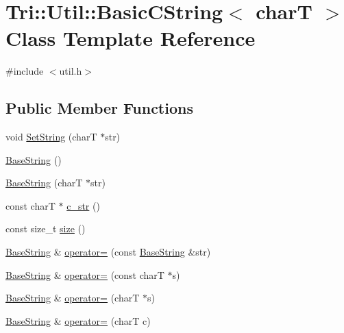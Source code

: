 \hypertarget{class_tri_1_1_util_1_1_basic_c_string}{}\section{Tri\+:\+:Util\+:\+:Basic\+C\+String$<$ char\+T $>$ Class Template Reference}
\label{class_tri_1_1_util_1_1_basic_c_string}


{\ttfamily \#include $<$util.\+h$>$}

\subsection*{Public Member Functions}
\begin{DoxyCompactItemize}
\item 
void \hyperlink{class_tri_1_1_util_1_1_basic_c_string_adf27dd027e7a2772d8e545d7acedab14}{Set\+String} (char\+T $\ast$str)
\item 
\hyperlink{class_tri_1_1_util_1_1_basic_c_string_a5f2654d450022bbb95555485e240b4c0}{Base\+String} ()
\item 
\hyperlink{class_tri_1_1_util_1_1_basic_c_string_a6140bfe408210dc8a4e154b7426d9a94}{Base\+String} (char\+T $\ast$str)
\item 
const char\+T $\ast$ \hyperlink{class_tri_1_1_util_1_1_basic_c_string_ab57e6f323d8c915107a0351354d59ff4}{c\+\_\+str} ()
\item 
const size\+\_\+t \hyperlink{class_tri_1_1_util_1_1_basic_c_string_a7fb3e47b6030440a0bba91e86b48625f}{size} ()
\item 
\hyperlink{class_tri_1_1_util_1_1_basic_c_string_a5f2654d450022bbb95555485e240b4c0}{Base\+String} \& \hyperlink{class_tri_1_1_util_1_1_basic_c_string_a209a934b745e09ad371fcce68ada62fe}{operator=} (const \hyperlink{class_tri_1_1_util_1_1_basic_c_string_a5f2654d450022bbb95555485e240b4c0}{Base\+String} \&str)
\item 
\hyperlink{class_tri_1_1_util_1_1_basic_c_string_a5f2654d450022bbb95555485e240b4c0}{Base\+String} \& \hyperlink{class_tri_1_1_util_1_1_basic_c_string_afdad2dcc1ef54c5ac03def9e0811f926}{operator=} (const char\+T $\ast$s)
\item 
\hyperlink{class_tri_1_1_util_1_1_basic_c_string_a5f2654d450022bbb95555485e240b4c0}{Base\+String} \& \hyperlink{class_tri_1_1_util_1_1_basic_c_string_ae6830b9a289f3ad67b991bfa393dba7b}{operator=} (char\+T $\ast$s)
\item 
\hyperlink{class_tri_1_1_util_1_1_basic_c_string_a5f2654d450022bbb95555485e240b4c0}{Base\+String} \& \hyperlink{class_tri_1_1_util_1_1_basic_c_string_ac5a8a779a24a224c8f825bddcfae1dee}{operator=} (char\+T c)

\end{DoxyCompactItemize}
